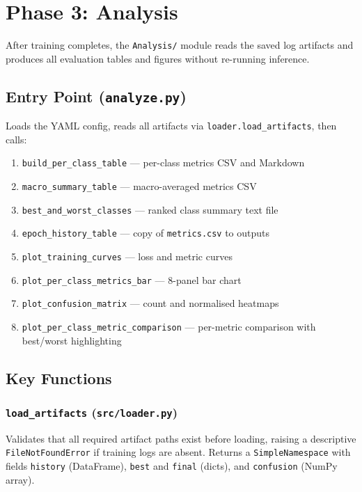 \documentclass[12pt,a4paper]{report}
\begin{document}
\chapter{Phase 3: Analysis}

After training completes, the \texttt{Analysis/} module reads the saved log artifacts and produces all evaluation tables and figures without re-running inference.

\section{Entry Point (\texttt{analyze.py})}

Loads the YAML config, reads all artifacts via \texttt{loader.load\_artifacts}, then calls:

\begin{enumerate}[nosep]
  \item \texttt{build\_per\_class\_table} — per-class metrics CSV and Markdown
  \item \texttt{macro\_summary\_table} — macro-averaged metrics CSV
  \item \texttt{best\_and\_worst\_classes} — ranked class summary text file
  \item \texttt{epoch\_history\_table} — copy of \texttt{metrics.csv} to outputs
  \item \texttt{plot\_training\_curves} — loss and metric curves
  \item \texttt{plot\_per\_class\_metrics\_bar} — 8-panel bar chart
  \item \texttt{plot\_confusion\_matrix} — count and normalised heatmaps
  \item \texttt{plot\_per\_class\_metric\_comparison} — per-metric comparison with best/worst highlighting
\end{enumerate}

\section{Key Functions}

\subsection{\texttt{load\_artifacts} (\texttt{src/loader.py})}

Validates that all required artifact paths exist before loading, raising a descriptive \texttt{FileNotFoundError} if training logs are absent. Returns a \texttt{SimpleNamespace} with fields \texttt{history} (DataFrame), \texttt{best} and \texttt{final} (dicts), and \texttt{confusion} (NumPy array).
\end{document}
